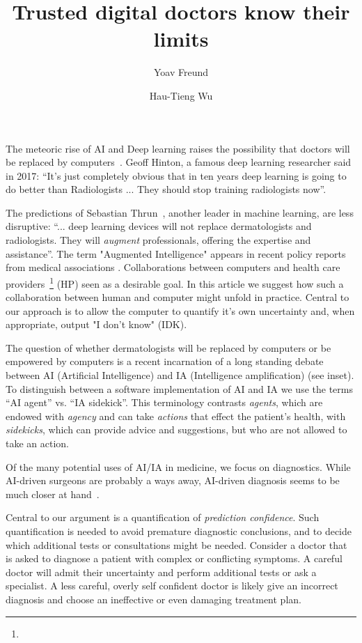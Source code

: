 \documentclass[11pt]{pnas-new}
\author[1]{Yoav Freund}
\author[2]{Hau-Tieng Wu}
\affil[1]{UCSD, Computer Science, San Diego, 92093, United States}
\affil[2]{Duke, Mathematics and Statistical Science, Durham, 27708, USA}
\title{Trusted digital doctors know their limits}
\newlength{\strutheight}
\begin{document}
\settoheight{\strutheight}{\strut}

 
\maketitle


The meteoric rise of AI and Deep learning raises the possibility that
doctors will be replaced by computers~\cite{Mukherjee2017}. Geoff Hinton,
a famous deep learning researcher said in 2017: ``It's just completely
obvious that in ten years deep learning is going to do better than
Radiologists ... They should stop training radiologists now''.

The predictions of Sebastian
Thrun~\cite{Mukherjee2017,esteva2017dermatologist}, another leader in
machine learning, are less disruptive: ``... deep learning devices
will not replace dermatologists and radiologists. They will {\em
  augment} professionals, offering the expertise and assistance''.
The term "Augmented Intelligence" appears in recent policy reports
from medical associations
\cite{american2019augmented,AAD2019augmented}.  Collaborations between
computers and health care providers~\footnote{} (HP) seen as a desirable goal.  In this
article we suggest how such a collaboration between human and computer
might unfold in practice. Central to our approach is to allow the
computer to quantify it's own uncertainty and, when appropriate,
output "I don't know" (IDK).
 
 The question of whether dermatologists will be
replaced by computers or be empowered by computers is a recent
incarnation of a long standing debate between AI (Artificial Intelligence) and IA
(Intelligence amplification) (see inset). To
distinguish between a software implementation of AI and IA we use the terms ``AI agent'' vs. ``IA
sidekick''. This terminology contrasts {\em agents}, which are endowed
with {\em agency} and can take {\em actions} that effect the patient's
health, with {\em sidekicks}, which can provide advice and suggestions,
but who are not allowed to take an action.

Of the many potential uses of AI/IA in medicine, we focus on diagnostics.
While AI-driven surgeons are probably a ways away, AI-driven diagnosis seems
to be much closer at hand~\cite{topol2019deep}. 

Central to our argument is a quantification of {\em prediction
  confidence}. Such quantification is needed to avoid premature
diagnostic conclusions, and to decide which additional tests or
consultations might be needed. Consider a doctor that is asked
to diagnose a patient with complex or conflicting symptoms. A careful
doctor will admit their uncertainty and perform additional tests or
ask a specialist. A less careful, overly self confident doctor is
likely give an incorrect diagnosis and choose an ineffective or even damaging
treatment plan.
\end{document}
